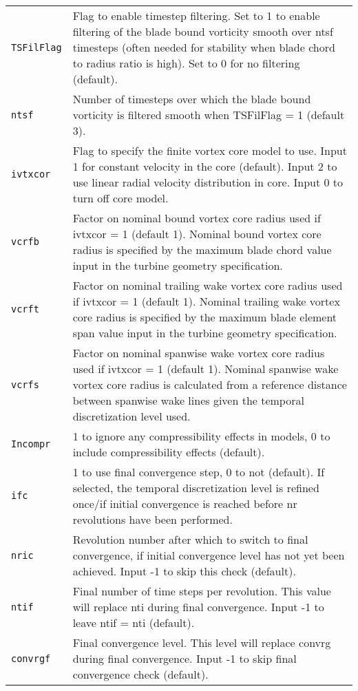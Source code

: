 \begin{longtable}{p{}p{}}
\texttt{TSFilFlag}            & Flag to enable timestep filtering. Set to 1 to enable filtering of the blade bound vorticity smooth over ntsf timesteps (often needed for stability when blade chord to radius ratio is high). Set to 0 for no filtering (default). \\ 
\texttt{ntsf}                 & Number of timesteps over which the blade bound vorticity is filtered smooth when TSFilFlag = 1 (default 3). \\ 
\texttt{ivtxcor}              & Flag to specify the finite vortex core model to use. Input 1 for constant velocity in the core (default). Input 2 to use linear radial velocity distribution in core. Input 0 to turn off core model. \\ 
\texttt{vcrfb}                & Factor on nominal bound vortex core radius used if ivtxcor = 1 (default 1). Nominal bound vortex core radius is specified by the maximum blade chord value input in the turbine geometry specification. \\ 
\texttt{vcrft}                & Factor on nominal trailing wake vortex core radius used if ivtxcor = 1 (default 1). Nominal trailing wake vortex core radius is specified by the maximum blade element span value input in the turbine geometry specification. \\ 
\texttt{vcrfs}                & Factor on nominal spanwise wake vortex core radius used if ivtxcor = 1 (default 1). Nominal spanwise wake vortex core radius is calculated from a reference distance between spanwise wake lines given the temporal discretization level used. \\ 
\texttt{Incompr}              & 1 to ignore any compressibility effects in models, 0 to include compressibility effects (default). \\ 
\texttt{ifc}                  & 1 to use final convergence step, 0 to not (default). If selected, the temporal discretization level is refined once/if initial convergence is reached before nr revolutions have been performed. \\ 
\texttt{nric}                 & Revolution number after which to switch to final convergence, if initial convergence level has not yet been achieved. Input -1 to skip this check (default). \\ 
\texttt{ntif}                 & Final number of time steps per revolution. This value will replace nti during final convergence. Input -1 to leave ntif = nti (default). \\ 
\texttt{convrgf}              & Final convergence level. This level will replace convrg during final convergence. Input -1 to skip final convergence check (default). \\ 

\end{longtable}
